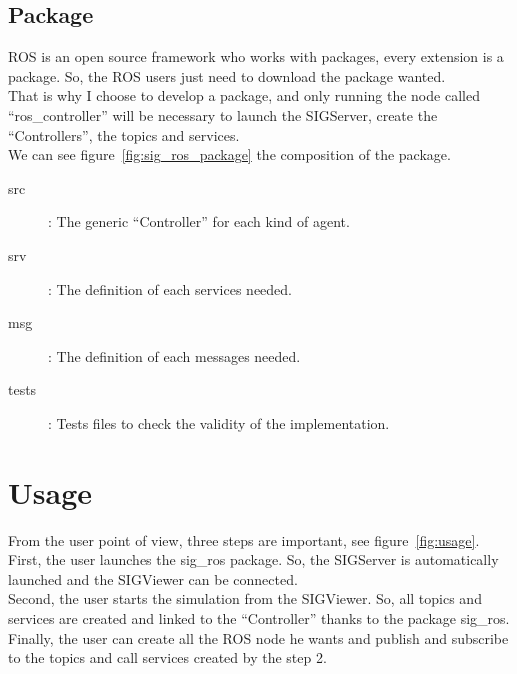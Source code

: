 \subsection{Package}
ROS is an open source framework who works with packages, every extension is a package. So, the ROS users just need to download the package wanted.\\
That is why I choose to develop a package, and only running the node called ``ros\_controller'' will be necessary to launch the SIGServer, create the ``Controllers'', the topics and services.\\
We can see figure~\ref{fig:sig_ros_package} the composition of the package.
\begin{description}
	\item[src] : The generic ``Controller'' for each kind of agent.
	\item[srv] : The definition of each services needed.
	\item[msg] : The definition of each messages needed.
	\item[tests] : Tests files to check the validity of the implementation.
\end{description}

\noindent\begin{minipage}{\linewidth}%
\label{fig:sig_ros_package}%
\end{minipage}

\section{Usage}
From the user point of view, three steps are important, see figure~\ref{fig:usage}.\\
First, the user launches the sig\_ros package. So, the SIGServer is automatically launched and the SIGViewer can be connected.\\
Second, the user starts the simulation from the SIGViewer. So, all topics and services are created and linked to the ``Controller'' thanks to the package sig\_ros.\\
Finally, the user can create all the ROS node he wants and publish and subscribe to the topics and call services created by the step 2.

